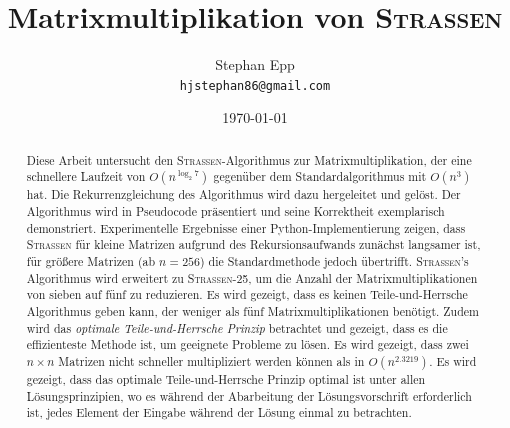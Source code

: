 \documentclass{scrartcl}
\title{Matrixmultiplikation von \normalfont\scshape{Strassen}}
\author{Stephan Epp\\\texttt{hjstephan86@gmail.com}}
\date{\today}
\begin{document}
\maketitle
\begin{abstract}
	Diese Arbeit untersucht den \textsc{Strassen}-Algorithmus zur Matrixmultiplikation, der eine schnellere Laufzeit von $O(n^{\log_2 7})$ gegenüber dem Standardalgorithmus mit $O(n^3)$ hat. Die Rekurrenzgleichung des Algorithmus wird dazu hergeleitet und gelöst. Der Algorithmus wird in Pseudocode präsentiert und seine Korrektheit exemplarisch demonstriert. Experimentelle Ergebnisse einer Python-Implementierung zeigen, dass \textsc{Strassen} für kleine Matrizen aufgrund des Rekursionsaufwands zunächst langsamer ist, für größere Matrizen (ab $n=256$) die Standardmethode jedoch übertrifft. \textsc{Strassen}'s Algorithmus wird erweitert zu \textsc{Strassen-25}, um die Anzahl der Matrixmultiplikationen von sieben auf fünf zu reduzieren. Es wird gezeigt, dass es keinen Teile-und-Herrsche Algorithmus geben kann, der weniger als fünf Matrixmultiplikationen benötigt. Zudem wird das \textit{optimale Teile-und-Herrsche Prinzip} betrachtet und gezeigt, dass es die effizienteste Methode ist, um geeignete Probleme zu lösen. Es wird gezeigt, dass zwei $n \times n$ Matrizen nicht schneller multipliziert werden können als in $O(n^{2.3219})$. Es wird gezeigt, dass das optimale Teile-und-Herrsche Prinzip optimal ist unter allen Lösungsprinzipien, wo es während der Abarbeitung der Lösungsvorschrift erforderlich ist, jedes Element der Eingabe während der Lösung einmal zu betrachten.
\end{abstract}
\end{document}
